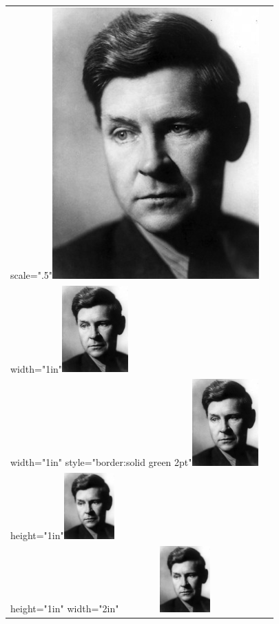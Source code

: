\documentclass[11pt,twoside]{article}\makeatletter
\begin{document}
\begin{longtable}{P{0.1980173482032218\textwidth}P{0.6519826517967782\textwidth}}
scale=".5"\tabcellsep \noindent\includegraphics[scale=.5,]{portrait.jpg}\\
width="1in"\tabcellsep \noindent\includegraphics[width=1in,]{portrait.jpg}\\
width="1in" style="border:solid green 2pt"\tabcellsep \noindent\includegraphics[width=1in,]{portrait.jpg}\\
height="1in"\tabcellsep \noindent\includegraphics[height=1in,]{portrait.jpg}\\
height="1in" width="2in"\tabcellsep \noindent\includegraphics[width=2in,height=1in,]{portrait.jpg}\\

\end{longtable}
\end{document}
